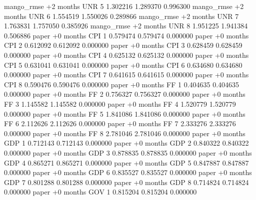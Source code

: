mango_rmse +2 months      UNR                 5 1.302216       1.289370           0.996300
mango_rmse +2 months      UNR                 6 1.554519       1.550026           0.289866
mango_rmse +2 months      UNR                 7 1.763831       1.757050           0.385926
mango_rmse +2 months      UNR                 8 1.951225       1.941384           0.506886
     paper +0 months      CPI                 1 0.579474       0.579474           0.000000
     paper +0 months      CPI                 2 0.612092       0.612092           0.000000
     paper +0 months      CPI                 3 0.628459       0.628459           0.000000
     paper +0 months      CPI                 4 0.625132       0.625132           0.000000
     paper +0 months      CPI                 5 0.631041       0.631041           0.000000
     paper +0 months      CPI                 6 0.634680       0.634680           0.000000
     paper +0 months      CPI                 7 0.641615       0.641615           0.000000
     paper +0 months      CPI                 8 0.590476       0.590476           0.000000
     paper +0 months       FF                 1 0.404635       0.404635           0.000000
     paper +0 months       FF                 2 0.756327       0.756327           0.000000
     paper +0 months       FF                 3 1.145582       1.145582           0.000000
     paper +0 months       FF                 4 1.520779       1.520779           0.000000
     paper +0 months       FF                 5 1.841086       1.841086           0.000000
     paper +0 months       FF                 6 2.112626       2.112626           0.000000
     paper +0 months       FF                 7 2.333276       2.333276           0.000000
     paper +0 months       FF                 8 2.781046       2.781046           0.000000
     paper +0 months      GDP                 1 0.712143       0.712143           0.000000
     paper +0 months      GDP                 2 0.840322       0.840322           0.000000
     paper +0 months      GDP                 3 0.878835       0.878835           0.000000
     paper +0 months      GDP                 4 0.865271       0.865271           0.000000
     paper +0 months      GDP                 5 0.847887       0.847887           0.000000
     paper +0 months      GDP                 6 0.835527       0.835527           0.000000
     paper +0 months      GDP                 7 0.801288       0.801288           0.000000
     paper +0 months      GDP                 8 0.714824       0.714824           0.000000
     paper +0 months      GOV                 1 0.815204       0.815204           0.000000
